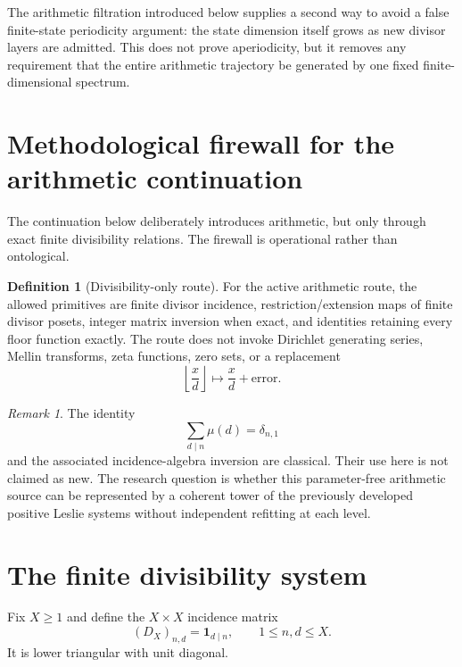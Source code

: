 \documentclass[11pt]{amsart}
\numberwithin{equation}{section}
\theoremstyle{plain}
\theoremstyle{definition}
\newtheorem{definition}[theorem]{Definition}
\theoremstyle{remark}
\newtheorem{remark}[theorem]{Remark}
\begin{document}
The arithmetic filtration introduced below supplies a second way to avoid a false finite-state
periodicity argument: the state dimension itself grows as new divisor layers are admitted.  This
does not prove aperiodicity, but it removes any requirement that the entire arithmetic trajectory
be generated by one fixed finite-dimensional spectrum.


\section{Methodological firewall for the arithmetic continuation}
\label{sec:arithmetic_firewall}

The continuation below deliberately introduces arithmetic, but only through exact finite
divisibility relations.  The firewall is operational rather than ontological.

\begin{definition}[Divisibility-only route]
\label{def:divisibility_only_route}
For the active arithmetic route, the allowed primitives are finite divisor incidence,
restriction/extension maps of finite divisor posets, integer matrix inversion when exact, and
identities retaining every floor function exactly.  The route does not invoke Dirichlet
generating series, Mellin transforms, zeta functions, zero sets, or a replacement
\[
\left\lfloor\frac xd\right\rfloor\mapsto\frac xd+\text{error}.
\]
\end{definition}

\begin{remark}
\label{rem:classical_origin_declared}
The identity
\[
\sum_{d\mid n}\mu(d)=\delta_{n,1}
\]
and the associated incidence-algebra inversion are classical.  Their use here is not claimed as
new.  The research question is whether this parameter-free arithmetic source can be represented
by a coherent tower of the previously developed positive Leslie systems without independent
refitting at each level.
\end{remark}


\section{The finite divisibility system}
\label{sec:finite_divisibility_system}

Fix $X\ge1$ and define the $X\times X$ incidence matrix
\begin{equation}
(D_X)_{n,d}=\mathbf 1_{d\mid n},
\qquad 1\le n,d\le X.
\label{eq:divisibility_matrix}
\end{equation}
It is lower triangular with unit diagonal.
\end{document}
